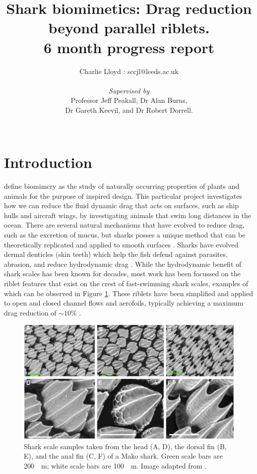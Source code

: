 \documentclass[12pt,oneside,a4paper]{article}
\title{Shark biomimetics: Drag reduction beyond parallel riblets.
\\
 6 month progress report
}
\author{Charlie Lloyd : sccjl@leeds.ac.uk
\\\\
\textit{Supervised by}
\\
Professor Jeff Peakall, Dr Alan Burns,
\\
Dr Gareth Keevil, and Dr Robert Dorrell.
\\\\}
\begin{document}
\maketitle



\newpage

\tableofcontents

\newpage
{}
\section{Introduction}
\cite{dean2010} define biomimcry as the study of naturally occurring properties of plants and animals for the purpose of inspired design. This particular project investigates how we can reduce the fluid dynamic drag that acts on surfaces, such as ship hulls and aircraft wings, by investigating animals that swim long distances in the ocean. There are several natural mechanisms that have evolved to reduce drag, such as the excretion of mucus, but sharks posses a unique method that can be theoretically replicated and applied to smooth surfaces \citep{dean2010}. Sharks have evolved dermal denticles (skin teeth) which help the fish defend against parasites, abrasion, and reduce hydrodynamic drag \citep{fletcher2014}. While the hydrodynamic benefit of shark scales has been known for decades, most work has been focussed on the riblet features that exist on the crest of fast-swimming shark scales, examples of which can be observed in Figure \ref{figure:scalesExample}. These riblets have been simplified and applied to open and closed channel flows and aerofoils, typically achieving a maximum drag reduction of $\sim 10\%$ \citep{dean2010}.
\begin{figure}[!b]
\centering
\includegraphics[width=12cm]{images/Scales2.png}
\caption{Shark scale samples taken from the head (A, D), the dorsal fin (B, E), and the anal fin (C, F) of a Mako shark. Green scale bars are \SI{200}{\mu m}; white scale bars are \SI{100}{\mu m}. Image adapted from \cite{wen2014}.}
\label{figure:scalesExample}
\end{figure}
\end{document}
